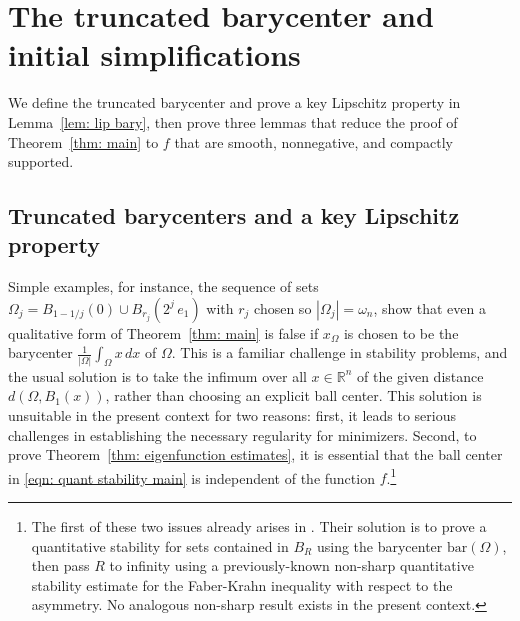 \documentclass[10pt, reqno]{amsart}
\numberwithin{equation}{section}
\def\R{{\mathbb R}}
\def\W{\Omega}
\def\om{\omega}
\begin{document}
\section{The truncated barycenter and initial simplifications}\label{sec: more preliminaries}
We define the truncated barycenter and prove a key Lipschitz property in Lemma~\ref{lem: lip bary}, then prove three lemmas that reduce the proof of  Theorem~\ref{thm: main} to $f$ that are smooth, nonnegative, and compactly supported.

 \subsection{Truncated barycenters and a key Lipschitz property}\label{sec: truncated barycenter}
\label{ssec: lip bary}
%
%
%
%
Simple examples, for instance, the sequence of sets $\Omega_j = B_{1-1/j}(0) \cup B_{r_j}(2^j\,e_1)$ with $r_j$  chosen so $|\Omega_j|= \om_n$,  show that even a qualitative form of Theorem~\ref{thm: main} is false if $x_\W$ is chosen to be the barycenter $ \tfrac{1}{|\W|}\int_\W x \,dx$ of $\W$.
This is a familiar challenge in stability problems, and the usual solution is to take the infimum over all $x \in \R^n$ of the given distance $d(\W, B_1(x))$, rather than choosing an explicit ball center. This solution is unsuitable in the present context for two reasons: first, it leads to serious challenges in establishing the necessary regularity for minimizers. 
Second, to prove Theorem~\ref{thm: eigenfunction estimates}, it is essential that the ball center in \eqref{eqn: quant stability main} is independent of the function $f$.\footnote{The first of these two issues already arises in \cite{BDV15}. 
Their solution is to prove a quantitative stability for sets contained in  $B_R$ using the barycenter $\text{bar}(\W)$, then pass $R$ to infinity using a previously-known non-sharp quantitative stability estimate \cite{FMP09} for the Faber-Krahn inequality with respect to the asymmetry. No analogous non-sharp result exists in the present context.}
\end{document}
